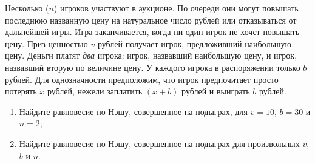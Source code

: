 \begin{problem}[«Лохотрон-??»]
\begin{source} \cite{shubik:doll} \end{source}
Несколько  ($n$)  игроков участвуют в аукционе. По очереди они могут повышать последнюю названную цену на натуральное число рублей или отказываться от дальнейшей игры. Игра заканчивается, когда ни один игрок не хочет повышать цену. Приз ценностью  $v$  рублей получает игрок, предложивший наибольшую цену. Деньги платят {\it два} игрока: игрок, назвавший наибольшую цену, и игрок, назвавший вторую по величине цену. У каждого игрока в распоряжении только  $b$  рублей. Для однозначности предположим, что игрок предпочитает просто потерять  $x$  рублей, нежели заплатить  $\left(x+b\right)$  рублей и выиграть  $b$  рублей.\par
\begin{enumerate}
\item  Найдите равновесие по Нэшу, совершенное на подыграх, для  $v=10$,  $b=30$  и  $n=2$;\par
\item Найдите равновесие по Нэшу, совершенное на подыграх для произвольных  $v$,  $b$  и  $n$.\par
\end{enumerate}


\begin{sol}
\end{sol}
\end{problem}



